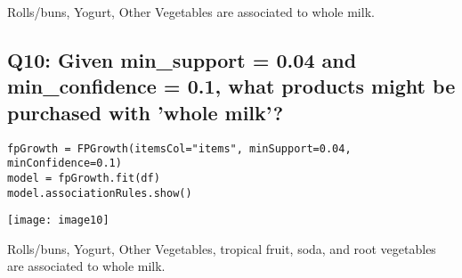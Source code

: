 \documentclass[]{article}
\begin{document}
Rolls/buns, Yogurt, Other Vegetables are associated to whole milk.

\subsection*{Q10: Given min\_support = 0.04 and min\_confidence = 0.1, what products might be purchased	with 'whole milk'?}

\begin{verbatim}
fpGrowth = FPGrowth(itemsCol="items", minSupport=0.04, minConfidence=0.1)
model = fpGrowth.fit(df)
model.associationRules.show()
\end{verbatim}
\texttt{[image: image10]}

Rolls/buns, Yogurt, Other Vegetables, tropical fruit, soda, and root vegetables are associated to whole milk.
\end{document}
